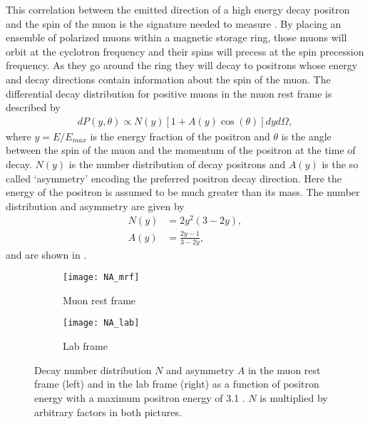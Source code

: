 This correlation between the emitted direction of a high energy decay positron and the spin of the muon is the signature needed to measure \wa. By placing an ensemble of polarized muons within a magnetic storage ring, those muons will orbit at the cyclotron frequency and their spins will precess at the spin precession frequency. As they go around the ring they will decay to positrons whose energy and decay directions contain information about the spin of the muon. The differential decay distribution for positive muons in the muon rest frame is described by \cite{Bucksbaum}
        \begin{align} \label{eq:diffdecaydist}
            dP(y, \theta) \propto N(y)[1 + A(y)\cos(\theta)]dy d\Omega,
        \end{align}
where $y=E/E_{max}$ is the energy fraction of the positron and $\theta$ is the angle between the spin of the muon and the momentum of the positron at the time of decay. $N(y)$ is the number distribution of decay positrons and $A(y)$ is the so called `asymmetry' encoding the preferred positron decay direction. Here the energy of the positron is assumed to be much greater than its mass. The number distribution and asymmetry are given by \cite{Bucksbaum}
        \begin{align}
            N(y) &= 2y^{2}(3-2y), \label{eq:Nmrf} \\
            A(y) &= \frac{2y-1}{3-2y}, \label{eq:Amrf}
        \end{align}
and are shown in . 

\begin{figure}[]
\centering
    \begin{subfigure}[]{0.45\textwidth}
        \centering
        \texttt{[image: NA\_mrf]}
        \caption{Muon rest frame}
    \label{fig:NA2mrf}
    \end{subfigure}%
    \hspace{1cm}
    \begin{subfigure}[]{0.45\textwidth}
        \centering
        \texttt{[image: NA\_lab]}
        \caption{Lab frame}
    \label{fig:NA2lab}    
    \end{subfigure}
\caption[Number distribution and asymmetry for muon decay in the muon rest frame and lab frame]{Decay number distribution $N$ and asymmetry $A$ in the muon rest frame (left) and in the lab frame (right) as a function of positron energy with a maximum positron energy of 3.1 \GeV. $N$ is multiplied by arbitrary factors in both pictures.}
\label{fig:NA2}
\end{figure}

